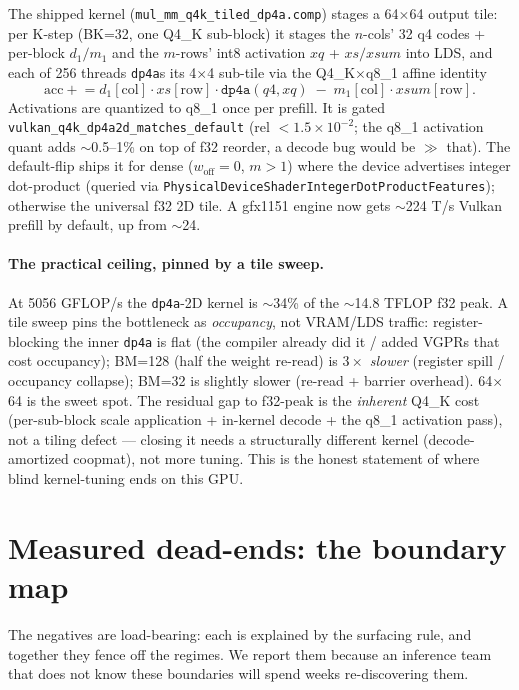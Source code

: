 \documentclass[11pt]{article}
\newcommand{\x}{\ensuremath{\times}}
\newcommand{\dpa}{\texttt{dp4a}}
\begin{document}
The shipped kernel (\texttt{mul\_mm\_q4k\_tiled\_dp4a.comp}) stages a 64$\times$64 output tile:
per K-step (BK=32, one Q4\_K sub-block) it stages the $n$-cols' 32 q4 codes + per-block $d_1/m_1$
and the $m$-rows' int8 activation $xq$ + $xs/xsum$ into LDS, and each of 256 threads \dpa{}s its
4$\times$4 sub-tile via the Q4\_K$\times$q8\_1 affine identity
\[
\text{acc} \mathrel{+}= d_1[\text{col}]\cdot xs[\text{row}]\cdot \dpa(q4, xq) \;-\; m_1[\text{col}]\cdot xsum[\text{row}].
\]
Activations are quantized to q8\_1 once per prefill. It is gated
\texttt{vulkan\_q4k\_dp4a2d\_matches\_default} (rel $<1.5\!\times\!10^{-2}$; the q8\_1 activation
quant adds $\sim$0.5--1\% on top of f32 reorder, a decode bug would be $\gg$ that). The default-flip
ships it for dense ($w_{\text{off}}{=}0$, $m{>}1$) where the device advertises integer dot-product
(queried via \texttt{PhysicalDeviceShaderIntegerDotProductFeatures}); otherwise the universal f32
2D tile. A gfx1151 engine now gets $\sim$224 T/s Vulkan prefill by default, up from $\sim$24.

\paragraph{The practical ceiling, pinned by a tile sweep.} At 5056 GFLOP/s the \dpa{}-2D kernel is
$\sim$34\% of the $\sim$14.8 TFLOP f32 peak. A tile sweep pins the bottleneck as \emph{occupancy},
not VRAM/LDS traffic: register-blocking the inner \dpa{} is flat (the compiler already did it / added
VGPRs that cost occupancy); BM=128 (half the weight re-read) is $3\x$ \emph{slower} (register spill
/ occupancy collapse); BM=32 is slightly slower (re-read + barrier overhead). 64$\times$64 is the
sweet spot. The residual gap to f32-peak is the \emph{inherent} Q4\_K cost (per-sub-block scale
application + in-kernel decode + the q8\_1 activation pass), not a tiling defect --- closing it
needs a structurally different kernel (decode-amortized coopmat), not more tuning. This is the
honest statement of where blind kernel-tuning ends on this GPU.

\section{Measured dead-ends: the boundary map}
\label{sec:deadends}
The negatives are load-bearing: each is explained by the surfacing rule, and together they fence
off the regimes. We report them because an inference team that does not know these boundaries will
spend weeks re-discovering them.
\end{document}
